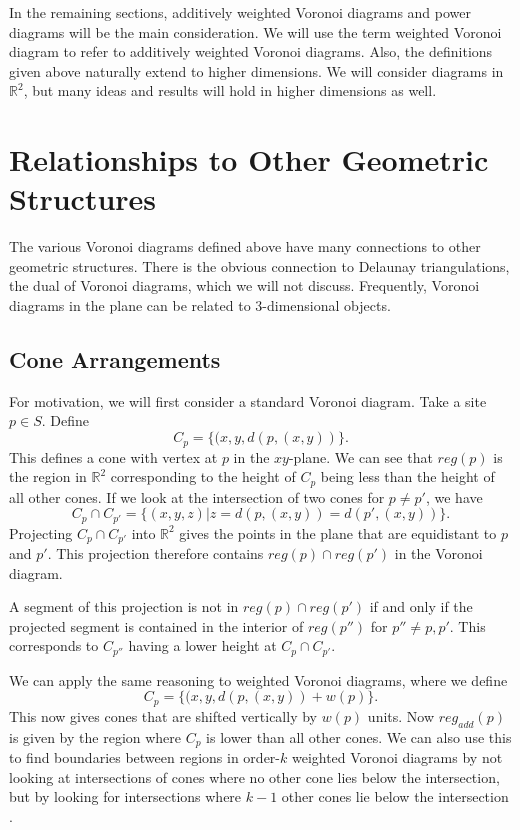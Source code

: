\documentclass[a4paper, 11pt]{article}
\newcommand{\R}{\mathbb{R}}
\begin{document}
In the remaining sections, additively weighted Voronoi diagrams and power diagrams will be the main consideration. We will use the term weighted
Voronoi diagram to refer to additively weighted Voronoi diagrams. Also, the definitions given above naturally extend to higher dimensions. We will
consider diagrams in $\R^2$, but many ideas and results will hold in higher dimensions as well.

\section{Relationships to Other Geometric Structures}
The various Voronoi diagrams defined above have many connections to other geometric structures. There is the obvious connection to Delaunay
triangulations, the dual of Voronoi diagrams, which we will not discuss. Frequently, Voronoi diagrams in the plane can be related to 3-dimensional
objects.

\subsection{Cone Arrangements}
\label{cone}
For motivation, we will first consider a standard Voronoi diagram. Take a site $p \in S$. Define
\[ C_p = \{ (x, y, d(p, (x,y)) \}. \]
This defines a cone with vertex at $p$ in the $xy$-plane. We can see that $reg(p)$ is the region in $\R^2$ corresponding to the height of $C_p$ being
less than the height of all other cones. If we look at the intersection of two cones for $p \neq p'$, we have
\[ C_p \cap C_{p'} = \{ (x,y,z) | z = d(p, (x,y)) = d(p', (x,y)) \}. \]
Projecting $C_p \cap C_{p'}$ into $\R^2$ gives the points in the plane that are equidistant to $p$ and $p'$. This projection therefore contains
$reg(p) \cap reg(p')$ in the Voronoi diagram.

A segment of this projection is not in $reg(p) \cap reg(p')$ if and only if the projected segment is contained in the interior of $reg(p'')$ for $p''
\neq p, p'$. This corresponds to $C_{p''}$ having a lower height at $C_p \cap C_{p'}$.

We can apply the same reasoning to weighted Voronoi diagrams, where we define
\[ C_p = \{ (x, y, d(p, (x,y)) + w(p) \}. \]
This now gives cones that are shifted vertically by $w(p)$ units. Now $reg_{add}(p)$ is given by the region where $C_p$ is lower than all other cones.
We can also use this to find boundaries between regions in order-$k$ weighted Voronoi diagrams by not looking at intersections of cones where no other
cone lies below the intersection, but by looking for intersections where $k-1$ other cones lie below the intersection \cite{rosenberger_additive}.
\end{document}

